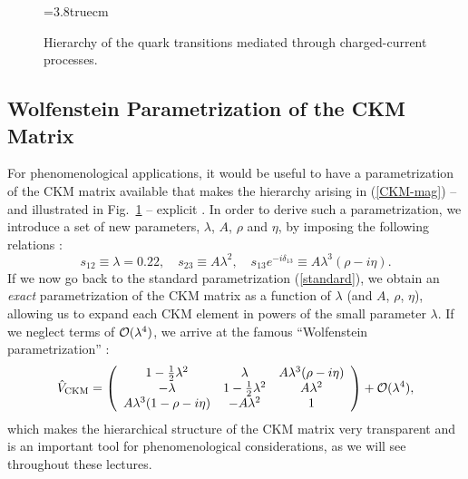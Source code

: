 \documentclass[12pt]{article}
\begin{document}
\begin{figure}
\centerline{
\epsfysize=3.8truecm
}
\vspace*{-0.2truecm}
\caption{Hierarchy of the quark transitions mediated through 
charged-current processes.}\label{fig:term}
\end{figure}


%
%
%
\subsection{Wolfenstein Parametrization of the CKM Matrix}
%
%
%
For phenomenological applications, it would be useful to have a 
parametrization of the CKM matrix available that makes the 
hierarchy arising in (\ref{CKM-mag}) -- and illustrated in
Fig.~\ref{fig:term} -- explicit \cite{wolf}. In order to derive such 
a parametrization, we introduce a set of new parameters, 
$\lambda$, $A$, $\rho$ and $\eta$, by imposing the following 
relations \cite{blo}:
\begin{equation}\label{set-rel}
s_{12}\equiv\lambda=0.22,\quad s_{23}\equiv A\lambda^2,\quad 
s_{13}e^{-i\delta_{13}}\equiv A\lambda^3(\rho-i\eta).
\end{equation}
If we now go back to the standard parametrization (\ref{standard}), we 
obtain an {\it exact} parametrization of the CKM matrix as a function of 
$\lambda$ (and $A$, $\rho$, $\eta$), allowing us to expand each CKM 
element in powers of the small parameter $\lambda$. If we neglect terms of 
${\cal O}(\lambda^4)$, we arrive at the famous ``Wolfenstein 
parametrization'' \cite{wolf}:
\begin{equation}\label{W-par}
\hat V_{\mbox{{\scriptsize CKM}}} =\left(\begin{array}{ccc}
1-\frac{1}{2}\lambda^2 & \lambda & A\lambda^3(\rho-i\eta) \\
-\lambda & 1-\frac{1}{2}\lambda^2 & A\lambda^2\\
A\lambda^3(1-\rho-i\eta) & -A\lambda^2 & 1
\end{array}\right)+{\cal O}(\lambda^4),
\end{equation}
which makes the hierarchical structure of the CKM matrix very transparent 
and is an important tool for phenomenological considerations, as we 
will see throughout these lectures. 
\end{document}
